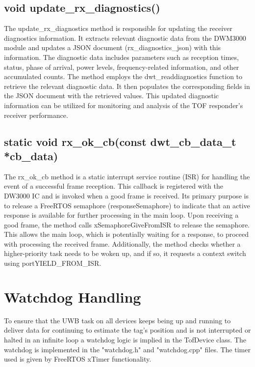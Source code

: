 \subsection{void update\_rx\_diagnostics()}
\label{subsec:TofResponder_update_rx_diagnostics}
The update\_rx\_diagnostics method is responsible for updating the receiver diagnostics information. 
It extracts relevant diagnostic data from the DWM3000 module and updates a JSON document (rx\_diagnostics\_json) with this information. 
The diagnostic data includes parameters such as reception times, status, phase of arrival, power levels, frequency-related information, and other accumulated counts.
\vspace{4pt}
\newline
The method employs the dwt\_readdiagnostics function to retrieve the relevant diagnostic data. 
It then populates the corresponding fields in the JSON document with the retrieved values. 
This updated diagnostic information can be utilized for monitoring and analysis of the TOF responder's receiver performance. 

\subsection{static void rx\_ok\_cb(const dwt\_cb\_data\_t *cb\_data)}
\label{subsec:TofResponder_rx_ok_cb}
The rx\_ok\_cb method is a static interrupt service routine (ISR) for handling the event of a successful frame reception. 
This callback is registered with the DW3000 IC and is invoked when a good frame is received. 
Its primary purpose is to release a FreeRTOS semaphore (responseSemaphore) to indicate that an active response is available for further processing in the main loop.
\vspace{4pt}
\newline
Upon receiving a good frame, the method calls xSemaphoreGiveFromISR to release the semaphore. This allows the main loop, which is potentially waiting for a response, to proceed with processing the received frame. Additionally, the method checks whether a higher-priority task needs to be woken up, and if so, it requests a context switch using portYIELD\_FROM\_ISR.

\section{Watchdog Handling}
\label{sec:Watchdog_Handling}
To ensure that the UWB task on all devices keeps being up and running to deliver data for continuing to estimate the tag's position and is not interrupted or halted in an infinite loop a watchdog logic is implied in the TofDevice class. 
The watchdog is implemented in the "watchdog.h" and "watchdog.cpp" files. 
The timer used is given by FreeRTOS xTimer functionality. 

